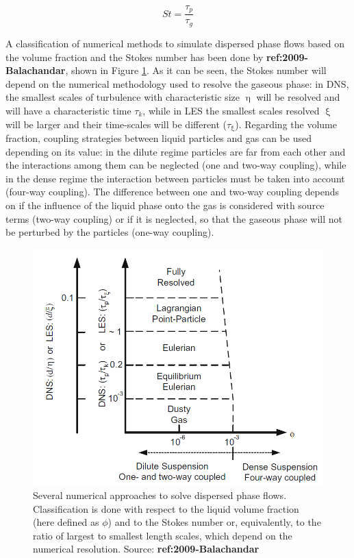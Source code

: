 \begin{equation}
\label{eq:Stokes_number_definition_general}
St = \frac{\tau_p}{\tau_g}
\end{equation}

A classification of numerical methods to simulate dispersed phase flows based on the volume fraction and the Stokes number has been done by \textbf{ref:2009-Balachandar}, shown in Figure \ref{fig:balachandar_numerical_methods_representation}. As it can be seen, the Stokes number will depend on the numerical methodology used to resolve the gaseous phase: in DNS, the smallest scales of turbulence with characteristic size $\upeta$ will be resolved and will have a characteristic time $\tau_k$, while in LES the smallest scales resolved $\upxi$ will be larger and their time-scales will be different ($\tau_\upxi$). Regarding the volume fraction, coupling strategies between liquid particles and gas can be used depending on its value: in the dilute regime particles are far from each other and the interactions among them can be neglected (one and two-way coupling), while in the dense regime the interaction between particles must be taken into account (four-way coupling). The difference between one and two-way coupling depends on if the influence of the liquid phase onto the gas is considered with source terms (two-way coupling) or if it is neglected, so that the gaseous phase will not be perturbed by the particles (one-way coupling).


\begin{figure}[h!]
	\centering
	\includegraphics[scale=0.6]{./part1_numerical_approaches/figures_ch3/balachandar_disperse_phase_classification}
	\caption{Several numerical approaches to solve dispersed phase flows. Classification is done with respect to the liquid volume fraction (here defined as $\phi$) and to the Stokes number or, equivalently, to the ratio of largest to smallest length scales, which depend on the numerical resolution.  Source: \textbf{ref:2009-Balachandar}}
	\label{fig:balachandar_numerical_methods_representation}
\end{figure}


